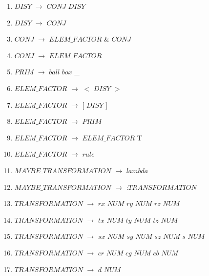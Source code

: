 \begin{enumerate}

\item $DISY$   	$\rightarrow$  $CONJ$ \textbar $DISY$ \\
\item $DISY$   	$\rightarrow$  $CONJ$ \\

\item $CONJ$   	$\rightarrow$  $ELEM\_FACTOR$ \& $CONJ$ \\
\item $CONJ$   	$\rightarrow$  $ELEM\_FACTOR$ \\

\item $PRIM$	$\rightarrow$	$ball$ \textbar $box$ \textbar \_ \\
\item $ELEM\_FACTOR$   	$\rightarrow$  $<$ $DISY$ $>$ \\
\item $ELEM\_FACTOR$   	$\rightarrow$  [ $DISY$ ] \\
\item $ELEM\_FACTOR$   	$\rightarrow$  $PRIM$ \\
\item $ELEM\_FACTOR$ 	$\rightarrow$  $ELEM\_FACTOR$ T \\
\item $ELEM\_FACTOR$ 	$\rightarrow$  $rule$ \\


\item $MAYBE\_TRANSFORMATION$   $\rightarrow$  $lambda$ \\
\item $MAYBE\_TRANSFORMATION$   $\rightarrow$  :$TRANSFORMATION$ \\

\item $TRANSFORMATION$  $\rightarrow$   $rx$ $NUM$ \textbar $ry$ $NUM$ \textbar $rz$ $NUM$ \\
\item $TRANSFORMATION$	$\rightarrow$	$tx$ $NUM$ \textbar $ty$ $NUM$ \textbar $tz$ $NUM$ \\
\item $TRANSFORMATION$	$\rightarrow$	$sx$ $NUM$ \textbar $sy$ $NUM$ \textbar $sz$ $NUM$ \textbar $s$ $NUM$ \\
\item $TRANSFORMATION$ 	$\rightarrow$	$cr$ $NUM$ \textbar $cg$ $NUM$ \textbar $cb$ $NUM$ \\
\item $TRANSFORMATION$	$\rightarrow$	$d$  $NUM$ \\



\end{enumerate}

\noindent
